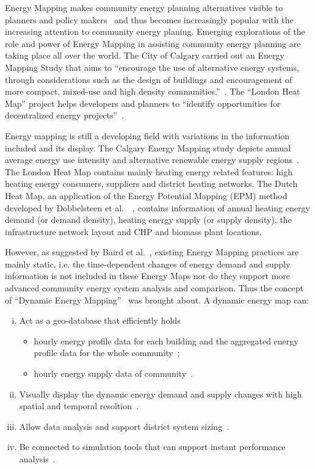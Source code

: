 Energy Mapping makes community energy planning alternatives visible to
planners and policy makers~\cite{baird2014} and thus becomes
increasingly popular with the increasing attention to community energy
planing. Emerging explorations of the role and power of Energy Mapping
in assisting community energy planning are taking place all over the
world. The City of Calgary carried out an Energy Mapping Study that
aims to ``encourage the use of alternative energy systems, through
considerations such as the design of buildings and encouragement of
more compact, mixed-use and high density
communities.''~\cite{baird2014}. The ``London Heat Map'' project helps
developers and planners to ``identify opportunities for decentralized
energy projects''~\cite{londonHeatMap}.

Energy mapping is still a developing field with variations in the
information included and its display. The Calgary Energy Mapping study
depicts annual average energy use intensity and alternative renewable
energy supply regions~\cite{aacip2009}. The London Heat Map contains
mainly heating energy related features: high heating energy consumers,
suppliers and district heating networks. The Dutch Heat Map, an
application of the Energy Potential Mapping (EPM) method developed by
Dobbelsteen et al.\ ~\cite{Dobbelsteen2013}, contains information of
annual heating energy demand (or demand density), heating energy
supply (or supply density), the infrastructure network layout and CHP
and biomass plant locations.

However, as suggested by Baird et al.\ , existing Energy Mapping
practices are mainly static, i.e. the time-dependent changes of energy
demand and supply information is not included in these Energy Maps nor
do they support more advanced community energy system analysis and
comparison. Thus the concept of ``Dynamic Energy
Mapping''~\cite{baird2014} was brought about. A dynamic energy map can:
\begin{enumerate}[i.]
\item Act as a geo-database that efficiently holds
  \begin{itemize}
  \item hourly energy profile data for each building and the
    aggregated energy profile data for the whole
    community~\cite{baird2014};
  \item hourly energy supply data of community~\cite{baird2014}.
  \end{itemize}
\item Visually display the dynamic energy demand and supply changes
  with high spatial and temporal resoltion~\cite{baird2014}.
\item Allow data analysis and support district system
  sizing~\cite{baird2014}.
\item Be connected to simulation tools that can support instant
  performance analysis~\cite{baird2014}.
\end{enumerate}
 
